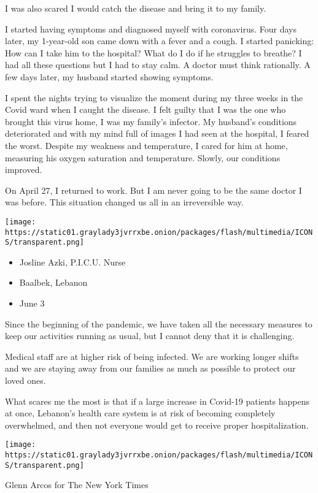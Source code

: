 I was also scared I would catch the disease and bring it to my family.

I started having symptoms and diagnosed myself with coronavirus. Four
days later, my 1-year-old son came down with a fever and a cough. I
started panicking: How can I take him to the hospital? What do I do if
he struggles to breathe? I had all these questions but I had to stay
calm. A doctor must think rationally. A few days later, my husband
started showing symptoms.

I spent the nights trying to visualize the moment during my three weeks
in the Covid ward when I caught the disease. I felt guilty that I was
the one who brought this virus home, I was my family's infector. My
husband's conditions deteriorated and with my mind full of images I had
seen at the hospital, I feared the worst. Despite my weakness and
temperature, I cared for him at home, measuring his oxygen saturation
and temperature. Slowly, our conditions improved.

On April 27, I returned to work. But I am never going to be the same
doctor I was before. This situation changed us all in an irreversible
way.

\texttt{[image: https://static01.graylady3jvrrxbe.onion/packages/flash/multimedia/ICONS/transparent.png]}

\begin{itemize}
\tightlist
\item
  Josline Azki, P.I.C.U. Nurse
\item
  Baalbek, Lebanon
\item
  June 3
\end{itemize}

Since the beginning of the pandemic, we have taken all the necessary
measures to keep our activities running as usual, but I cannot deny that
it is challenging.

Medical staff are at higher risk of being infected. We are working
longer shifts and we are staying away from our families as much as
possible to protect our loved ones.

What scares me the most is that if a large increase in Covid-19 patients
happens at once, Lebanon's health care system is at risk of becoming
completely overwhelmed, and then not everyone would get to receive
proper hospitalization.

\texttt{[image: https://static01.graylady3jvrrxbe.onion/packages/flash/multimedia/ICONS/transparent.png]}

Glenn Arcos for The New York Times

